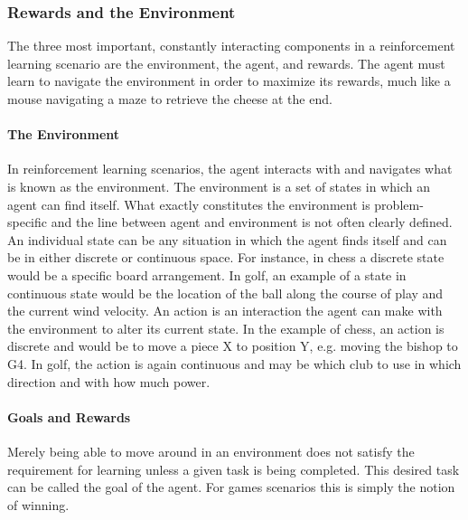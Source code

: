 \subsubsection{Rewards and the Environment}


The three most important, constantly interacting components in a reinforcement
learning scenario are
the environment, the agent, and rewards.
%
The agent must learn to navigate the environment in order to maximize its
rewards,
much like a mouse navigating a maze to retrieve the cheese at the end.

\paragraph{The Environment}

In reinforcement learning scenarios,
the agent interacts with and navigates what is known as the environment.
%
The environment is a set of states in which an agent can find itself.
%
What exactly constitutes the environment is problem-specific
and the line between agent and environment is not often clearly defined.
%
An individual state can be any situation in which the agent finds itself
and can be in either discrete or continuous space.
%
For instance, in chess a discrete state would be a specific board arrangement.
%
In golf, an example of a state in continuous state would be 
the location of the ball along the course of play
and the current wind velocity.
%
An action is an interaction the agent can make with the environment to alter
its current state.
%
In the example of chess,
an action is discrete and would be to move a piece X to position Y,
e.g. moving the bishop to G4.
%
In golf, the action is again continuous and may be
which club to use in which direction and with how much power.

\paragraph{Goals and Rewards}

Merely being able to move around in an environment does not satisfy the
requirement for learning unless a given task is being completed.
%
This desired task can be called the goal of the agent.
%
For games scenarios
this is simply the notion of winning.

